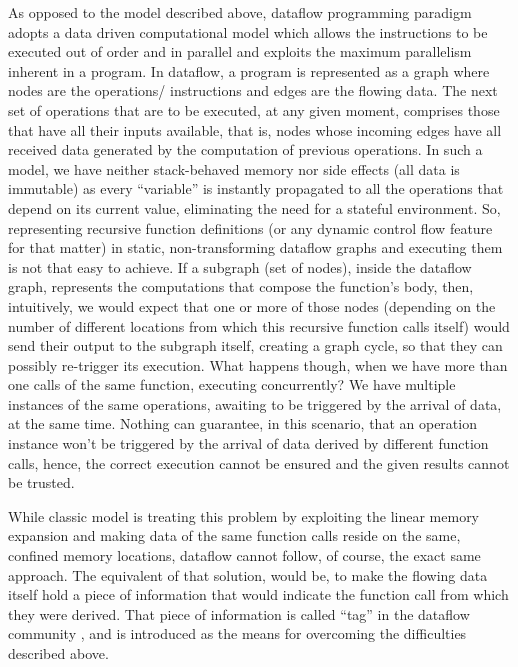 \documentclass[ack,preface]{dithesis}
\begin{document}
As opposed to the model described above, dataflow programming paradigm adopts a data driven computational model which allows the instructions to be executed out of order and in parallel and exploits the maximum parallelism inherent in a program. In dataflow, a program is represented as a graph where nodes are the operations/ instructions and edges are the flowing data. The next set of operations that are to be executed, at any given moment, comprises those that have all their inputs available, that is, nodes whose incoming edges have all received data generated by the computation of previous operations. In such a model, we have neither stack-behaved memory nor side effects (all data is immutable) as every “variable” is instantly propagated to all the operations that depend on its current value, eliminating the need for a stateful environment. So, representing recursive function definitions (or any dynamic control flow feature for that matter) in static, non-transforming dataflow graphs and executing them is not that easy to achieve. If a subgraph (set of nodes), inside the dataflow graph, represents the computations that compose the function’s body, then, intuitively, we would expect that one or more of those nodes (depending on the number of different locations from which this recursive function calls itself) would send their output to the subgraph itself, creating a graph cycle, so that they can possibly re-trigger its execution. What happens though, when we have more than one calls of the same function, executing concurrently?  We have multiple instances of the same operations, awaiting to be triggered by the arrival of data, at the same time. Nothing can guarantee, in this scenario, that an operation instance won’t be triggered by the arrival of data derived by different function calls, hence, the correct execution cannot be ensured and the given results cannot be trusted.

While classic model is treating this problem by exploiting the linear memory expansion and making data of the same function calls reside on the same, confined memory locations, dataflow cannot follow, of course, the exact same approach. The equivalent of that solution, would be, to make the flowing data itself hold a piece of information that would indicate the function call from which they were derived. That piece of information is called “tag” in the dataflow community \cite{Nikhil:2000}, and is introduced as the means for overcoming the difficulties described above.\\
\end{document}
